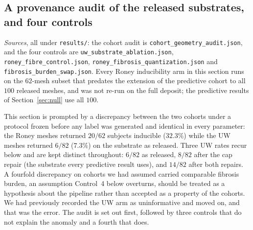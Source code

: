 \documentclass[11pt]{article}
\theoremstyle{definition}
\newcommand{\code}[1]{\texttt{#1}}
\begin{document}
\subsection{A provenance audit of the released substrates, and four controls}
\label{sec:substrate}
\noindent\emph{Sources}, all under \code{results/}: the cohort audit is
\code{cohort\allowbreak\_geometry\allowbreak\_audit.json}, and the four controls are
\code{uw\allowbreak\_substrate\allowbreak\_ablation.json},
\code{roney\allowbreak\_fibre\allowbreak\_control.json},
\code{roney\allowbreak\_fibrosis\allowbreak\_quantization.json} and
\code{fibrosis\allowbreak\_burden\allowbreak\_swap.json}. Every Roney inducibility
arm in this section runs on the $62$-mesh subset that predates the extension of
the predictive cohort to all $100$ released meshes, and was not re-run on the
full deposit; the predictive results of Section~\ref{sec:null} use all $100$.

This section is prompted by a discrepancy between the two cohorts under a
protocol frozen before any label was generated and identical in every parameter:
the Roney meshes returned $20/62$ subjects inducible ($32.3\%$) while the UW
meshes returned $6/82$ ($7.3\%$) on the substrate as released. Three UW rates
recur below and are kept distinct throughout: $6/82$ as released, $8/82$ after
the cap repair (the substrate every predictive result uses), and $14/82$ after
both repairs. A fourfold discrepancy on cohorts we had assumed carried
comparable fibrosis burden, an assumption Control~4 below overturns, should be
treated as a hypothesis about the pipeline rather than accepted as a property of
the cohorts. We had previously recorded the UW arm as uninformative and moved
on, and that was the error. The audit is set out first, followed by three
controls that do not explain the anomaly and a fourth that does.
\end{document}
